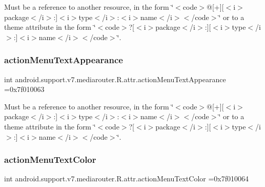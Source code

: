 Must be a reference to another resource, in the form \char`\"{}$<$code$>$@\mbox{[}+\mbox{]}\mbox{[}$<$i$>$package$<$/i$>$\+:\mbox{]}$<$i$>$type$<$/i$>$\+:$<$i$>$name$<$/i$>$$<$/code$>$\char`\"{} or to a theme attribute in the form \char`\"{}$<$code$>$?\mbox{[}$<$i$>$package$<$/i$>$\+:\mbox{]}\mbox{[}$<$i$>$type$<$/i$>$\+:\mbox{]}$<$i$>$name$<$/i$>$$<$/code$>$\char`\"{}. \mbox{\label{classandroid_1_1support_1_1v7_1_1mediarouter_1_1R_1_1attr_aebe88f0c8db6fae20c36c9647a69dd4e}} 
\subsubsection{\texorpdfstring{action\+Menu\+Text\+Appearance}{actionMenuTextAppearance}}
{\footnotesize\ttfamily int android.\+support.\+v7.\+mediarouter.\+R.\+attr.\+action\+Menu\+Text\+Appearance =0x7f010063\hspace{0.3cm}{\ttfamily [static]}}

Must be a reference to another resource, in the form \char`\"{}$<$code$>$@\mbox{[}+\mbox{]}\mbox{[}$<$i$>$package$<$/i$>$\+:\mbox{]}$<$i$>$type$<$/i$>$\+:$<$i$>$name$<$/i$>$$<$/code$>$\char`\"{} or to a theme attribute in the form \char`\"{}$<$code$>$?\mbox{[}$<$i$>$package$<$/i$>$\+:\mbox{]}\mbox{[}$<$i$>$type$<$/i$>$\+:\mbox{]}$<$i$>$name$<$/i$>$$<$/code$>$\char`\"{}. \mbox{\label{classandroid_1_1support_1_1v7_1_1mediarouter_1_1R_1_1attr_a6625ba27df16c5355edf5c14c613afcb}} 
\subsubsection{\texorpdfstring{action\+Menu\+Text\+Color}{actionMenuTextColor}}
{\footnotesize\ttfamily int android.\+support.\+v7.\+mediarouter.\+R.\+attr.\+action\+Menu\+Text\+Color =0x7f010064\hspace{0.3cm}{\ttfamily [static]}}

